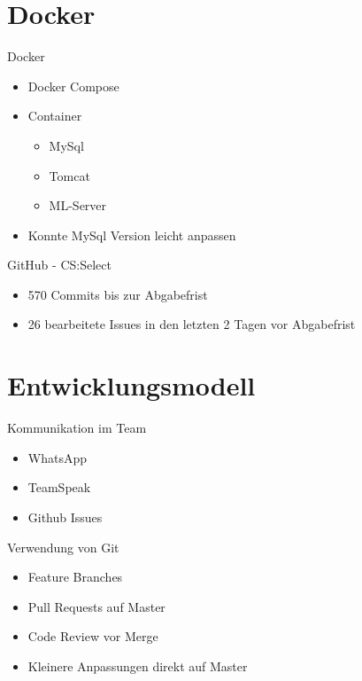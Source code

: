 \documentclass[xcolor=dvipsnames]{beamer}
\begin{document}
\section{Docker}
\begin{frame}{Docker}
\begin{itemize}
    \item Docker Compose
    \item Container
    \begin{itemize}
        \item MySql
        \item Tomcat
        \item ML-Server
    \end{itemize}
    \item Konnte MySql Version leicht anpassen
\end{itemize}
\end{frame}
\begin{frame}{GitHub - CS:Select}
  \begin{itemize}
    \item 570 Commits bis zur Abgabefrist \\
    \item 26 bearbeitete Issues in den letzten 2 Tagen vor Abgabefrist \\
  \end{itemize}
\end{frame}

\section{Entwicklungsmodell}
    \begin{frame}{Kommunikation im Team}
        \begin{itemize}
            \item WhatsApp
            \item TeamSpeak
            \item Github Issues
        \end{itemize}
    \end{frame}
    \begin{frame}{Verwendung von Git}
        \begin{itemize}
            \item Feature Branches
            \item Pull Requests auf Master
            \item Code Review vor Merge
            \item Kleinere Anpassungen direkt auf Master
        \end{itemize}
    \end{frame}
\end{document}
